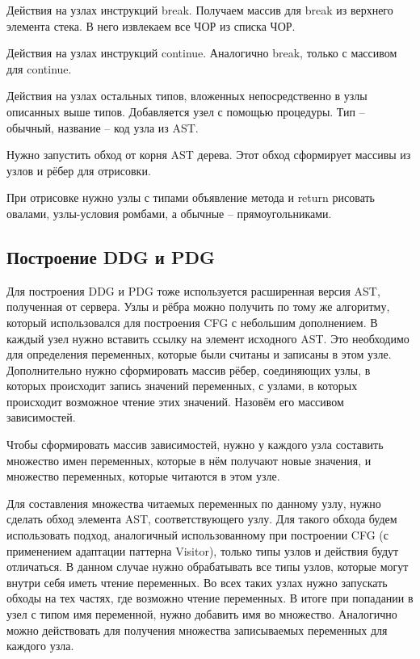 Действия на узлах инструкций break. Получаем массив для break из верхнего элемента стека. В него извлекаем все ЧОР из списка ЧОР.

Действия на узлах инструкций continue. Аналогично break, только с массивом для continue.

Действия на узлах остальных типов, вложенных непосредственно в узлы описанных выше типов. Добавляется узел с помощью процедуры. Тип – обычный, название – код узла из AST.

Нужно запустить обход от корня AST дерева. Этот обход сформирует массивы из узлов и рёбер для отрисовки.

При отрисовке нужно узлы с типами объявление метода и return рисовать овалами, узлы-условия ромбами, а обычные – прямоугольниками.
\subsection{Построение DDG и PDG} \label{ch2:subsec-title-abbr}

Для построения DDG и PDG тоже используется расширенная версия AST, полученная от сервера. Узлы и рёбра можно получить по тому же алгоритму, который использовался для построения CFG с небольшим дополнением. В каждый узел нужно вставить ссылку на элемент исходного AST. Это необходимо для определения переменных, которые были считаны и записаны в этом узле. Дополнительно нужно сформировать массив рёбер, соединяющих узлы, в которых происходит запись значений переменных, с узлами, в которых происходит возможное чтение этих значений. Назовём его массивом зависимостей.

Чтобы сформировать массив зависимостей, нужно у каждого узла составить множество имен переменных, которые в нём получают новые значения, и множество переменных, которые читаются в этом узле.

Для составления множества читаемых переменных по данному узлу, нужно сделать обход элемента AST, соответствующего узлу. Для такого обхода будем использовать подход, аналогичный использованному при построении CFG (с применением адаптации паттерна Visitor), только типы узлов и действия будут отличаться. В данном случае нужно обрабатывать все типы узлов, которые могут внутри себя иметь чтение переменных. Во всех таких узлах нужно запускать обходы на тех частях, где возможно чтение переменных. В итоге при попадании в узел с типом имя переменной, нужно добавить имя во множество. Аналогично можно действовать для получения множества записываемых переменных для каждого узла.

